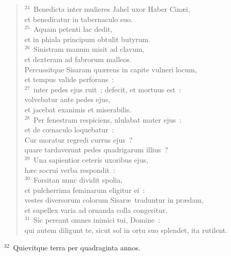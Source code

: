 \begin{verse}${}^{24}$~Benedicta inter mulieres Jahel uxor Haber Cin\ae i,\\ et benedicatur in tabernaculo suo.\\
${}^{25}$~Aquam petenti lac dedit,\\ et in phiala principum obtulit butyrum.\\
${}^{26}$~Sinistram manum misit ad clavum,\\ et dexteram ad fabrorum malleos.\\ Percussitque Sisaram qu\ae rens in capite vulneri locum,\\ et tempus valide perforans~:\\
${}^{27}$~inter pedes ejus ruit~; defecit, et mortuus est~:\\ volvebatur ante pedes ejus,\\ et jacebat exanimis et miserabilis.\\
${}^{28}$~Per fenestram respiciens, ululabat mater ejus~:\\ et de cœnaculo loquebatur~:\\ Cur moratur regredi currus ejus~?\\ quare tardaverunt pedes quadrigarum illius~?\\
${}^{29}$~Una sapientior ceteris uxoribus ejus,\\ h\ae c socrui verba respondit~:\\
${}^{30}$~Forsitan nunc dividit spolia,\\ et pulcherrima feminarum eligitur ei~:\\ vestes diversorum colorum Sisar\ae\ traduntur in pr\ae dam,\\ et supellex varia ad ornanda colla congeritur.\\
${}^{31}$~Sic pereant omnes inimici tui, Domine~:\\ qui autem diligunt te, sicut sol in ortu suo splendet, ita rutilent.\end{verse}


${}^{32}$~Quievitque terra per quadraginta annos.

